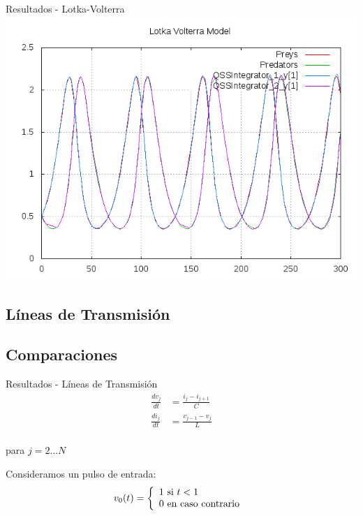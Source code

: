 \documentclass[10pt,handout]{beamer}
\begin{document}
\begin{frame}{Resultados - Lotka-Volterra}
\includegraphics[width=\textwidth]{output/lotka_volterra/lotka_volterra-all.png}
\end{frame}

	\subsection{Líneas de Transmisión}
	\subsection{Comparaciones}

\begin{frame}{Resultados - Líneas de Transmisión}
\begin{equation*}
\begin{split}
\frac{d v_{j}}{d t} &= \frac{i_{j} - i_{j+1}}{C} \\
\frac{d i_{j}}{d t} &= \frac{v_{j-1} - v_{j}}{L} \\	
\end{split}
\end{equation*}

para $j = 2 \dots N$

Consideramos un pulso de entrada:
\begin{equation*}
v_0(t) = \left\{ 
  \begin{array}{l l}
    1 \text{ si } t < 1 \\
    0 \text{ en caso contrario }
  \end{array} \right.
\end{equation*}
\end{frame}
\end{document}

